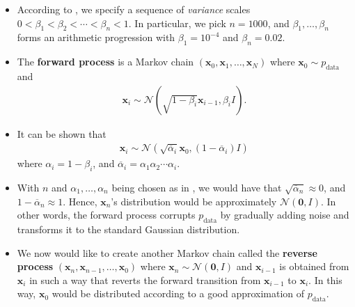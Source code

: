 \documentclass[10pt]{article}
\newcommand{\ve}[1]{\mathbf{#1}}
\newcommand{\mrm}[1]{\mathrm{#1}}
\newcommand{\mcal}[1]{\mathcal{#1}}
\begin{document}
\begin{itemize}
  \item According to \cite{Ho:2020}, we specify a sequence of \emph{variance} scales $0 < \beta_1 < \beta_2 < \dotsb < \beta_n < 1$. In particular, we pick $n = 1000$, and $\beta_1, \dotsc, \beta_n$ forms an arithmetic progression with $\beta_1 = 10^{-4}$ and $\beta_n = 0.02$.
  
  \item The {\bf forward process} is a Markov chain $(\ve{x}_0, \ve{x}_1, \dotsc, \ve{x}_N)$ where $\ve{x}_0 \sim p_{\mrm{data}}$ and
  \begin{align*}
    \ve{x}_i \sim \mcal{N}(\sqrt{1 - \beta_i} \ve{x}_{i-1}, \beta_i I).
  \end{align*}

  \item It can be shown that
  \begin{align*}
    \ve{x}_i \sim \mcal{N}(\sqrt{\overline{\alpha}_i} \ve{x}_0, (1 - \overline{\alpha}_i) I)
  \end{align*}
  where $\alpha_i = 1 - \beta_i$, and $\overline{\alpha}_i = \alpha_1 \alpha_2 \dotsm \alpha_i$.

  \item With $n$ and $\alpha_1, \dotsc, \alpha_n$ being chosen as in \cite{Ho:2020}, we would have that $\sqrt{\overline{\alpha}_n} \approx 0$, and $1 - \overline{\alpha}_n \approx 1$. Hence, $\ve{x}_n$'s distribution would be approximately $\mcal{N}(\ve{0}, I)$. In other words, the forward process corrupts $p_{\mrm{data}}$ by gradually adding noise and transforms it to the standard Gaussian distribution.
  
  \item We now would like to create another Markov chain called the {\bf reverse process} $(\ve{x}_n, \ve{x}_{n-1}, \dotsc, \ve{x}_0)$ where $\ve{x}_n \sim \mcal{N}(\ve{0},I)$ and $\ve{x}_{i-1}$ is obtained from $\ve{x}_i$ in such a way that reverts the forward transition from $\ve{x}_{i-1}$ to $\ve{x}_i$. In this way, $\ve{x}_0$ would be distributed according to a good approximation of $p_{\mrm{data}}$.
  

\end{itemize}
\end{document}
